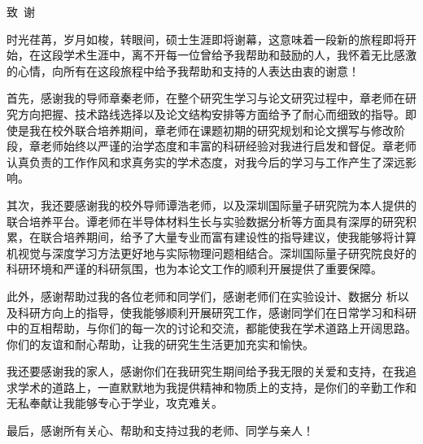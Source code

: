 \begin{szuAppendix}{致~谢}

\songti{}
\setlength{\baselineskip}{23pt}
时光荏苒，岁月如梭，转眼间，硕士生涯即将谢幕，这意味着一段新的旅程即将开始，在这段学术生涯中，离不开每一位曾给予我帮助和鼓励的人，我怀着无比感激的心情，向所有在这段旅程中给予我帮助和支持的人表达由衷的谢意！

首先，感谢我的导师章秦老师，在整个研究生学习与论文研究过程中，章老师在研究方向把握、技术路线选择以及论文结构安排等方面给予了耐心而细致的指导。即使是我在校外联合培养期间，章老师在课题初期的研究规划和论文撰写与修改阶段，章老师始终以严谨的治学态度和丰富的科研经验对我进行启发和督促。章老师认真负责的工作作风和求真务实的学术态度，对我今后的学习与工作产生了深远影响。

其次，我还要感谢我的校外导师谭浩老师，以及深圳国际量子研究院为本人提供的联合培养平台。谭老师在半导体材料生长与实验数据分析等方面具有深厚的研究积累，在联合培养期间，给予了大量专业而富有建设性的指导建议，使我能够将计算机视觉与深度学习方法更好地与实际物理问题相结合。深圳国际量子研究院良好的科研环境和严谨的科研氛围，也为本论文工作的顺利开展提供了重要保障。

此外，感谢帮助过我的各位老师和同学们，感谢老师们在实验设计、数据分 析以及科研方向上的指导，使我能够顺利开展研究工作，感谢同学们在日常学习和科研中的互相帮助，与你们的每一次的讨论和交流，都能使我在学术道路上开阔思路。你们的友谊和耐心帮助，让我的研究生生活更加充实和愉快。

我还要感谢我的家人，感谢你们在我研究生期间给予我无限的关爱和支持，在我追求学术的道路上，一直默默地为我提供精神和物质上的支持，是你们的辛勤工作和无私奉献让我能够专心于学业，攻克难关。

最后，感谢所有关心、帮助和支持过我的老师、同学与亲人！

\end{szuAppendix}

